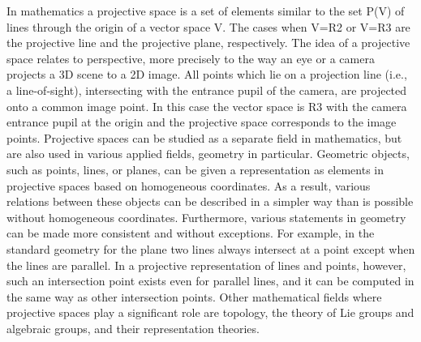 In mathematics a projective space is a set of elements similar to
the set P(V) of lines through the origin of a vector space V. The
cases when V=R2 or V=R3 are the projective line and the projective
plane, respectively. The idea of a projective space relates to perspective,
more precisely to the way an eye or a camera projects a 3D scene to
a 2D image. All points which lie on a projection line (i.e., a \textquotedbl{}line-of-sight\textquotedbl{}),
intersecting with the entrance pupil of the camera, are projected
onto a common image point. In this case the vector space is R3 with
the camera entrance pupil at the origin and the projective space corresponds
to the image points. Projective spaces can be studied as a separate
field in mathematics, but are also used in various applied fields,
geometry in particular. Geometric objects, such as points, lines,
or planes, can be given a representation as elements in projective
spaces based on homogeneous coordinates. As a result, various relations
between these objects can be described in a simpler way than is possible
without homogeneous coordinates. Furthermore, various statements in
geometry can be made more consistent and without exceptions. For example,
in the standard geometry for the plane two lines always intersect
at a point except when the lines are parallel. In a projective representation
of lines and points, however, such an intersection point exists even
for parallel lines, and it can be computed in the same way as other
intersection points. Other mathematical fields where projective spaces
play a significant role are topology, the theory of Lie groups and
algebraic groups, and their representation theories.

